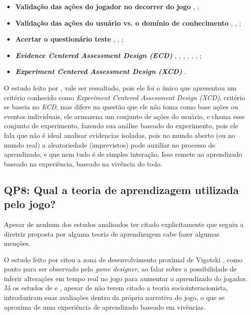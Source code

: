 \documentclass[12pt]{article}
\begin{document}
\begin{itemize}
    \item \textbf{Validação das ações do jogador no decorrer do jogo} \cite{rowe2017assessing}, \cite{baron2014approach};
    \item \textbf{Validação das ações do usuário vs. o domínio de conhecimento} \cite{rowe2017assessing}, \cite{moreno2007game}, \cite{asbell2013assessment};
    \item \textbf{Acertar o questionário teste} \cite{kam2007localized}, \cite{kam2009improving}, \cite{del2010easing};
    \item \textbf{\textit{Evidence Centered Assessment Design (ECD)}} \cite{harpstead2013search}, \cite{falakmasir2016data}, \cite{georgiadis2018accommodating}, \cite{georgiadis2019learning}, \cite{georgiadis2019bolstering}, \cite{georgiadis2019reinforcing}, \cite{min2019deepstealth};
    \item \textbf{\textit{Experiment Centered Assessment Design (XCD)}} \cite{conrad2014framework}.
\end{itemize}

O estudo feito por \cite{conrad2014framework}, vale ser ressaltado, pois ele foi o único que apresentou um critério conhecido como \textit{Experiment Centered Assessment Design (XCD)}, critério se baseia no \textit{ECD}, mas difere na questão que ele não toma como base ações ou eventos individuais, ele armazena um conjunto de ações do usuário, e chama esse conjunto de experimento, fazendo sua análise baseado do experimento, pois ele fala que não é ideal analisar evidencias isoladas, pois no mundo aberto (ou no mundo real) a aleatoriedade (imprevistos) pode auxiliar no processo de aprendizado, e que nem tudo é de simples interação. Isso remete ao aprendizado baseado na experiência, baseado na vivência do todo.

\subsection{QP8: Qual a teoria de aprendizagem utilizada pelo jogo?}\label{qual_teoria_de_aprendizagem}

Apesar de nenhum dos estudos analisados ter citado explicitamente que seguiu a diretriz proposta por alguma teoria de aprendizagem cabe fazer algumas menções.

O estudo feito por \cite{rowe2017assessing} citou a zona de desenvolvimento proximal de Vigotski \cite{vygotsky1997collected}, como ponto para ser observado pelo \textit{game designer}, ao falar sobre a possibilidade de inferir alterações em tempo real no jogo para aumentar o aprendizado do jogador. Já os estudos de \cite{moreno2007game} e \cite{conrad2014framework}, apesar de não terem citado a teoria sociointeracionista, introduziram suas avaliações dentro da própria narrativa do jogo, o que se aproxima de uma experiência de aprendizado baseado em vivências.
\end{document}
